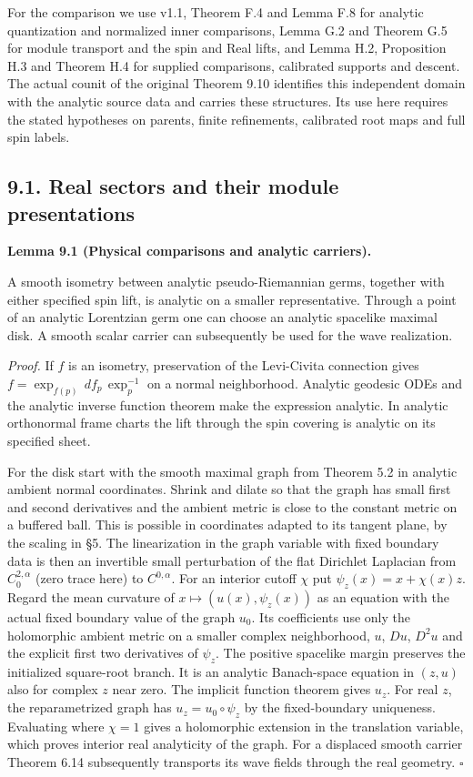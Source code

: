 \documentclass[
  english,
  11pt,
  reqno]{amsart}
\makeatletter
\newcommand{\paperdisplaynext}{%
  \let\paper@savedstartsection\@startsection
  \def\@startsection##1##2##3##4##5##6{%
    \let\@startsection\paper@savedstartsection
    \@tempskipa ##5\relax
    \ifdim\@tempskipa<\z@
      \def\paper@afterskip{.35\baselineskip}%
    \else
      \def\paper@afterskip{##5}%
    \fi
    \@startsection{##1}{##2}{##3}{##4}{\paper@afterskip}{##6}}}
\newcommand{\paperdisplaysection}{\paperdisplaynext\subsection}
\newcommand{\pandocstatementheading}[1]{%
  \par\if@nobreak\else
    \addpenalty{\@beginparpenalty}%
    \addvspace{.5\baselineskip plus .2\baselineskip minus .2\baselineskip}%
  \fi
  {\normalfont\bfseries #1\par}%
  \nobreak\@afterindenttrue\@afterheading
}
\let\paper@displaysection\paperdisplaysection
\renewcommand{\paperdisplaysection}[1]{%
  \let\paper@savedhangfrom\@hangfrom
  \long\def\@hangfrom##1##2{%
    \paper@savedhangfrom{##1}{\paper@headingparagraph##2}}%
  \paper@displaysection{#1}%
  \let\@hangfrom\paper@savedhangfrom}
\makeatother
\begin{document}
For the comparison we use v1.1, Theorem F.4 and Lemma F.8 for analytic
quantization and normalized inner comparisons, Lemma G.2 and Theorem G.5
for module transport and the spin and Real lifts, and Lemma H.2,
Proposition H.3 and Theorem H.4 for supplied comparisons, calibrated
supports and descent. The actual counit of the original Theorem 9.10
identifies this independent domain with the analytic source data and
carries these structures. Its use here requires the stated hypotheses on
parents, finite refinements, calibrated root maps and full spin labels.

\paperdisplaysection{9.1. Real sectors and their module
presentations}\label{real-sectors-and-their-module-presentations}\label{sec:analytic-sector-restriction}

\pandocstatementheading{\leavevmode{}\label{lem:analytic-physical-maps-and-carrier}Lemma 9.1 (Physical comparisons and analytic carriers).}

A smooth isometry between analytic pseudo-Riemannian germs, together
with either specified spin lift, is analytic on a smaller
representative. Through a point of an analytic Lorentzian germ one can
choose an analytic spacelike maximal disk. A smooth scalar carrier can
subsequently be used for the wave realization.

\emph{Proof.} If \(f\) is an isometry, preservation of the Levi-Civita
connection gives \(f=\exp_{f(p)}\,d f_p\,\exp_p^{-1}\) on a normal
neighborhood. Analytic geodesic ODEs and the analytic inverse function
theorem make the expression analytic. In analytic orthonormal frame
charts the lift through the spin covering is analytic on its specified
sheet.

For the disk start with the smooth maximal graph from Theorem 5.2 in
analytic ambient normal coordinates. Shrink and dilate so that the graph
has small first and second derivatives and the ambient metric is close
to the constant metric on a buffered ball. This is possible in
coordinates adapted to its tangent plane, by the scaling in §5. The
linearization in the graph variable with fixed boundary data is then an
invertible small perturbation of the flat Dirichlet Laplacian from
\(C^{2,\alpha}_0\) (zero trace here) to \(C^{0,\alpha}\). For an
interior cutoff \(\chi\) put \(\psi_z(x)=x+\chi(x)z\). Regard the mean
curvature of \(x\mapsto(u(x),\psi_z(x))\) as an equation with the actual
fixed boundary value of the graph \(u_0\). Its coefficients use only the
holomorphic ambient metric on a smaller complex neighborhood, \(u\),
\(Du\), \(D^2u\) and the explicit first two derivatives of \(\psi_z\).
The positive spacelike margin preserves the initialized square-root
branch. It is an analytic Banach-space equation in \((z,u)\) also for
complex \(z\) near zero. The implicit function theorem gives \(u_z\).
For real \(z\), the reparametrized graph has \(u_z=u_0\circ\psi_z\) by
the fixed-boundary uniqueness. Evaluating where \(\chi=1\) gives a
holomorphic extension in the translation variable, which proves interior
real analyticity of the graph. For a displaced smooth carrier Theorem
6.14 subsequently transports its wave fields through the real geometry.
\hfill\(\square\)
\end{document}
